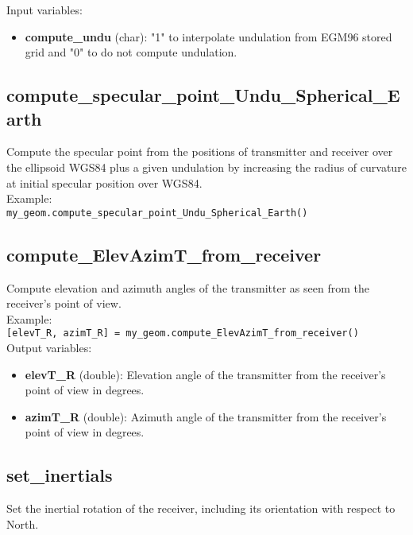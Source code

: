 Input variables:
\begin{itemize}
\item {\bf compute\_undu} (char): "1" to interpolate undulation from EGM96 stored grid and "0" to do not compute undulation.
\end{itemize}


\subsection{compute\_specular\_point\_Undu\_Spherical\_Earth}

Compute the specular point from the positions of transmitter and receiver over the ellipsoid WGS84 plus a given undulation by increasing the radius of curvature at initial specular position over WGS84.\\

Example:\\

\texttt{my\_geom.compute\_specular\_point\_Undu\_Spherical\_Earth()}\\


\subsection{compute\_ElevAzimT\_from\_receiver}

Compute elevation and azimuth angles of the transmitter as seen from the receiver's point of view.\\

Example:\\

\texttt{[elevT\_R, azimT\_R] = my\_geom.compute\_ElevAzimT\_from\_receiver()}\\

Output variables:
\begin{itemize}
\item {\bf elevT\_R} (double): Elevation angle of the transmitter from the receiver's point of view in degrees.
\item {\bf azimT\_R} (double): Azimuth angle of the transmitter from the receiver's point of view in degrees.
\end{itemize}


\subsection{set\_inertials}

Set the inertial rotation of the receiver, including its orientation with respect to North.\\

